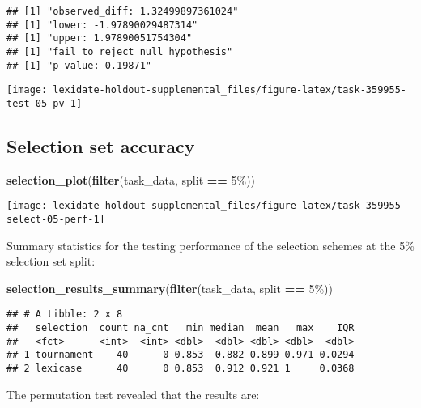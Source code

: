 \documentclass[
]{book}
\newenvironment{Shaded}{\begin{snugshade}}{\end{snugshade}}
\newcommand{\FunctionTok}[1]{\textcolor[rgb]{0.13,0.29,0.53}{\textbf{#1}}}
\newcommand{\NormalTok}[1]{#1}
\newcommand{\SpecialCharTok}[1]{\textcolor[rgb]{0.81,0.36,0.00}{\textbf{#1}}}
\newcommand{\StringTok}[1]{\textcolor[rgb]{0.31,0.60,0.02}{#1}}
\begin{document}
\begin{verbatim}
## [1] "observed_diff: 1.32499897361024"
## [1] "lower: -1.97890029487314"
## [1] "upper: 1.97890051754304"
## [1] "fail to reject null hypothesis"
## [1] "p-value: 0.19871"
\end{verbatim}

\texttt{[image: lexidate-holdout-supplemental\_files/figure-latex/task-359955-test-05-pv-1]}

\hypertarget{selection-set-accuracy-10}{%
\subsection{Selection set accuracy}\label{selection-set-accuracy-10}}

\begin{Shaded}
\begin{Highlighting}[]
\FunctionTok{selection\_plot}\NormalTok{(}\FunctionTok{filter}\NormalTok{(task\_data, split }\SpecialCharTok{==} \StringTok{\textquotesingle{}5\%\textquotesingle{}}\NormalTok{))}
\end{Highlighting}
\end{Shaded}

\texttt{[image: lexidate-holdout-supplemental\_files/figure-latex/task-359955-select-05-perf-1]}

Summary statistics for the testing performance of the selection schemes at the 5\% selection set split:

\begin{Shaded}
\begin{Highlighting}[]
\FunctionTok{selection\_results\_summary}\NormalTok{(}\FunctionTok{filter}\NormalTok{(task\_data, split }\SpecialCharTok{==} \StringTok{\textquotesingle{}5\%\textquotesingle{}}\NormalTok{))}
\end{Highlighting}
\end{Shaded}

\begin{verbatim}
## # A tibble: 2 x 8
##   selection  count na_cnt   min median  mean   max    IQR
##   <fct>      <int>  <int> <dbl>  <dbl> <dbl> <dbl>  <dbl>
## 1 tournament    40      0 0.853  0.882 0.899 0.971 0.0294
## 2 lexicase      40      0 0.853  0.912 0.921 1     0.0368
\end{verbatim}

The permutation test revealed that the results are:
\end{document}
